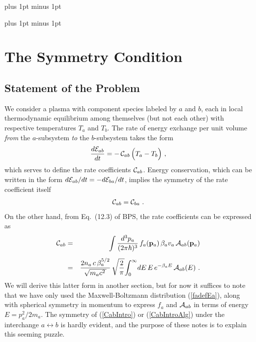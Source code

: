 \documentclass[preprint,12pt,eqsecnum,nofootinbib,amsmath,amssymb]{revtex4}
\newcommand{\bodyskip}{\baselineskip 18pt plus 1pt minus 1pt}
\newcommand{\tableofcontentsskip}{\baselineskip 14pt plus 1pt minus 1pt}
\begin{document}
\pagebreak
\tableofcontentsskip
\tableofcontents

\newpage
\bodyskip

\pagebreak
\clearpage

\newpage
\section{The Symmetry Condition
}

\subsection{Statement of the Problem}

We consider a plasma with component species labeled by $a$ and $b$,
each in local thermodynamic equilibrium among themselves (but not each
other) with respective temperatures $T_a$ and $T_b$. The rate of
energy exchange per unit volume {\em from} the $a$-subsystem {\em to}
the $b$-subsystem takes the form
\begin{eqnarray}
  \frac{d{\cal E}_{ab}}{dt} 
  = 
  -\,{\cal C}_{ab}\,\Big(T_a - T_b \Big) \ ,
\label{dEdtabIntro}
\end{eqnarray}
which serves to define the rate coefficients ${\cal C}_{ab}$. Energy
conservation, which can be written in the form $d{\cal E}_{ab}/dt =
-d{\cal E}_{ba}/dt$, implies the symmetry of the rate coefficient
itself
\begin{eqnarray}
  {\cal C}_{ab}={\cal C}_{ba} \ .
\end{eqnarray}
On the other hand, from Eq.~(12.3) of BPS, the rate coefficients can
be expressed as
\begin{eqnarray}
  {\cal C}_{ab} 
  &=& 
  \int \frac{d^3 p_a}{(2\pi\hbar)^3}\, f_a({\bf p}_a)\,
  \beta_a v_a\,{\cal A}_{ab}({\bf p}_a) 
\label{CabIntro}
\\[5pt]
  &=&
  \frac{2 n_a\, c\, \beta_a^{5/2}}{\sqrt{m_ac^2\,}}\,
  \sqrt{\frac{2}{\pi}} \! \int_0^\infty \! dE\,E\, e^{-\beta_a E} \,
  {\cal A}_{ab}(E) \ .
\label{CabIntroAlg}
\end{eqnarray}
We will derive this latter form in another section, but for now it
suffices to note that we have only used the Maxwell-Boltzmann
distribution (\ref{fadefEa}), along with spherical symmetry in
momentum to express $f_a$ and ${\cal A}_{ab}$ in terms of energy
$E=p_a^2/2m_a$. The symmetry of (\ref{CabIntro}) or
(\ref{CabIntroAlg}) under the interchange $a \leftrightarrow b$ is
hardly evident, and the purpose of these notes is to explain this
seeming puzzle.
\end{document}
